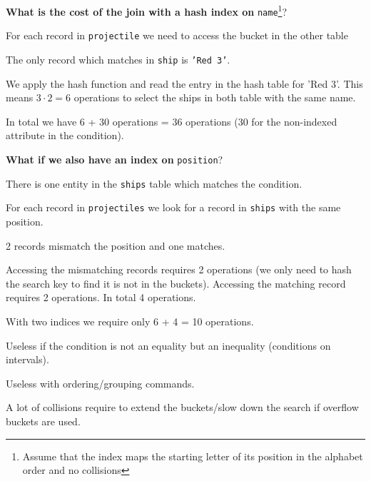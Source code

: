 \documentclass{beamer}
\begin{document}
\begin{slide}{
\item \textbf{What is the cost of the join with a hash index on} \texttt{name}\footnote{Assume that the index maps the starting letter of its position in the alphabet order and no collisions}?
\pause
\item For each record in \texttt{projectile} we need to access the bucket in the other table
\item The only record which matches in \texttt{ship} is \texttt{'Red 3'}.
\item We apply the hash function and read the entry in the hash table for 'Red 3'. This means $3 \cdot 2 = 6$ operations to select the ships in both table with the same name.
\item In total we have 6 + 30 operations = 36 operations (30 for the non-indexed attribute in the condition).
}\end{slide}

\begin{slide}{
\item \textbf{What if we also have an index on} \texttt{position}?
\pause
\item There is one entity in the \texttt{ships} table which matches the condition.
\item For each record in \texttt{projectiles} we look for a record in \texttt{ships} with the same position.
\item 2 records mismatch the position and one matches.
\item Accessing the mismatching records requires 2 operations (we only need to hash the search key to find it is not in the buckets). Accessing the matching record requires 2 operations. In total 4 operations.
\item With two indices we require only 6 + 4 = 10 operations.
}\end{slide}

\begin{slide}{
\item Useless if the condition is not an equality but an inequality (conditions on intervals).
\item Useless with ordering/grouping commands.
\item A lot of collisions require to extend the buckets/slow down the search if overflow buckets are used.
}\end{slide}
\end{document}
